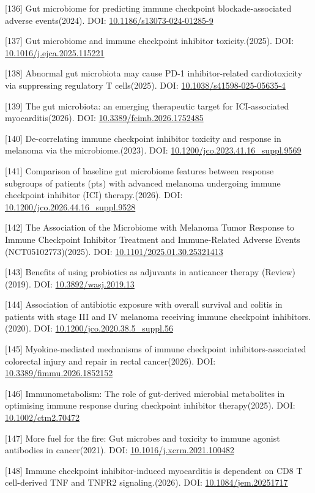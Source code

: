 \documentclass[11pt]{article}
\begin{document}
{[}136{]} Gut microbiome for predicting immune checkpoint blockade-associated adverse events(2024). DOI: \url{10.1186/s13073-024-01285-9}

{[}137{]} Gut microbiome and immune checkpoint inhibitor toxicity.(2025). DOI: \url{10.1016/j.ejca.2025.115221}

{[}138{]} Abnormal gut microbiota may cause PD-1 inhibitor-related cardiotoxicity via suppressing regulatory T cells(2025). DOI: \url{10.1038/s41598-025-05635-4}

{[}139{]} The gut microbiota: an emerging therapeutic target for ICI-associated myocarditis(2026). DOI: \url{10.3389/fcimb.2026.1752485}

{[}140{]} De-correlating immune checkpoint inhibitor toxicity and response in melanoma via the microbiome.(2023). DOI: \url{10.1200/jco.2023.41.16_suppl.9569}

{[}141{]} Comparison of baseline gut microbiome features between response subgroups of patients (pts) with advanced melanoma undergoing immune checkpoint inhibitor (ICI) therapy.(2026). DOI: \url{10.1200/jco.2026.44.16_suppl.9528}

{[}142{]} The Association of the Microbiome with Melanoma Tumor Response to Immune Checkpoint Inhibitor Treatment and Immune-Related Adverse Events (NCT05102773)(2025). DOI: \url{10.1101/2025.01.30.25321413}

{[}143{]} Benefits of using probiotics as adjuvants in anticancer therapy (Review)(2019). DOI: \url{10.3892/wasj.2019.13}

{[}144{]} Association of antibiotic exposure with overall survival and colitis in patients with stage III and IV melanoma receiving immune checkpoint inhibitors.(2020). DOI: \url{10.1200/jco.2020.38.5_suppl.56}

{[}145{]} Myokine-mediated mechanisms of immune checkpoint inhibitors-associated colorectal injury and repair in rectal cancer(2026). DOI: \url{10.3389/fimmu.2026.1852152}

{[}146{]} Immunometabolism: The role of gut-derived microbial metabolites in optimising immune response during checkpoint inhibitor therapy(2025). DOI: \url{10.1002/ctm2.70472}

{[}147{]} More fuel for the fire: Gut microbes and toxicity to immune agonist antibodies in cancer(2021). DOI: \url{10.1016/j.xcrm.2021.100482}

{[}148{]} Immune checkpoint inhibitor-induced myocarditis is dependent on CD8 T cell-derived TNF and TNFR2 signaling.(2026). DOI: \url{10.1084/jem.20251717}
\end{document}
